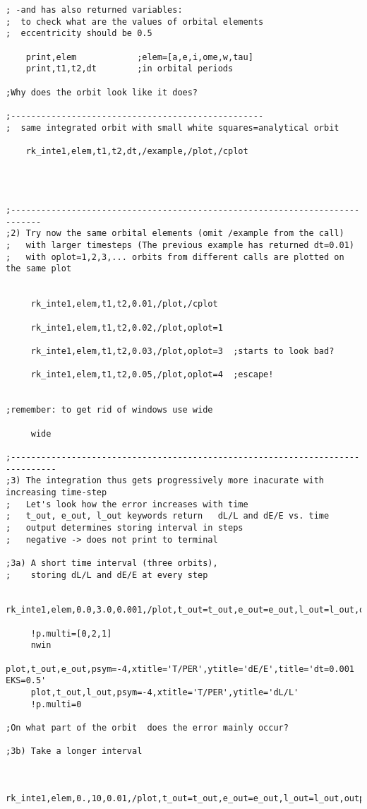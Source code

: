 \documentclass[12pt,landscape]{article}
\begin{document}
\begin{verbatim}
; -and has also returned variables:
;  to check what are the values of orbital elements
;  eccentricity should be 0.5

    print,elem            ;elem=[a,e,i,ome,w,tau]
    print,t1,t2,dt        ;in orbital periods

;Why does the orbit look like it does?

;--------------------------------------------------
;  same integrated orbit with small white squares=analytical orbit

    rk_inte1,elem,t1,t2,dt,/example,/plot,/cplot


  

;----------------------------------------------------------------------------
;2) Try now the same orbital elements (omit /example from the call)
;   with larger timesteps (The previous example has returned dt=0.01)
;   with oplot=1,2,3,... orbits from different calls are plotted on the same plot


     rk_inte1,elem,t1,t2,0.01,/plot,/cplot

     rk_inte1,elem,t1,t2,0.02,/plot,oplot=1

     rk_inte1,elem,t1,t2,0.03,/plot,oplot=3  ;starts to look bad?

     rk_inte1,elem,t1,t2,0.05,/plot,oplot=4  ;escape!


;remember: to get rid of windows use wide

     wide

;-------------------------------------------------------------------------------
;3) The integration thus gets progressively more inacurate with increasing time-step
;   Let's look how the error increases with time
;   t_out, e_out, l_out keywords return   dL/L and dE/E vs. time
;   output determines storing interval in steps
;   negative -> does not print to terminal

;3a) A short time interval (three orbits),
;    storing dL/L and dE/E at every step 

     rk_inte1,elem,0.0,3.0,0.001,/plot,t_out=t_out,e_out=e_out,l_out=l_out,output=-1

     !p.multi=[0,2,1]
     nwin
     plot,t_out,e_out,psym=-4,xtitle='T/PER',ytitle='dE/E',title='dt=0.001 EKS=0.5'
     plot,t_out,l_out,psym=-4,xtitle='T/PER',ytitle='dL/L'
     !p.multi=0

;On what part of the orbit  does the error mainly occur?

;3b) Take a longer interval


     rk_inte1,elem,0.,10,0.01,/plot,t_out=t_out,e_out=e_out,l_out=l_out,output=-20


\end{verbatim}
\end{document}
